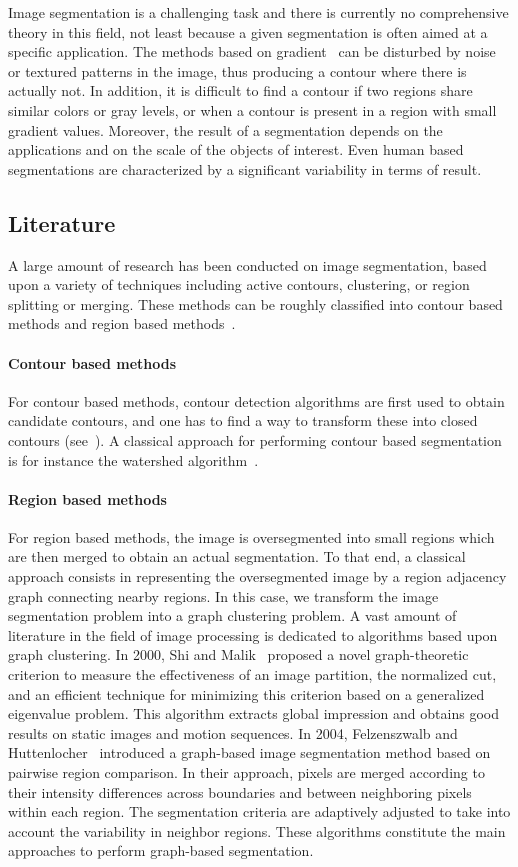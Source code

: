 \documentclass{article}
\begin{document}
        Image segmentation is a challenging task and there is currently no comprehensive theory in this field, not least because a given segmentation is often aimed at a specific application. The methods based on gradient~\cite{watershed1991,arbelaez2011} can be disturbed by noise or textured patterns in the image, thus producing a contour where there is actually not. In addition, it is difficult to find a contour if two regions share similar colors or gray levels, or when a contour is present in a region with small gradient values. Moreover, the result of a segmentation depends on the applications and on the scale of the objects of interest. Even human based segmentations are characterized by a significant variability in terms of result.

    \subsection{Literature}
        A large amount of research has been conducted on image segmentation, based upon a variety of techniques including active contours, clustering, or region splitting or merging. These methods can be roughly classified into contour based methods and region based methods~\cite{arbelaez2011}.
        \paragraph{Contour based methods} For contour based methods, contour detection algorithms are first used to obtain candidate contours, and one has to find a way to transform these into closed contours (see~\cite{ren2005, arbelaez2011}). A classical approach for performing contour based segmentation is for instance the watershed algorithm~\cite{watershed1991}.
        \paragraph{Region based methods} For region based methods, the image is oversegmented into small regions which are then merged to obtain an actual segmentation. To that end, a classical approach consists in representing the oversegmented image by a region adjacency graph connecting nearby regions. In this case, we transform the image segmentation problem into a graph clustering problem. A vast amount of literature in the field of image processing is dedicated to algorithms based upon graph clustering. In 2000, Shi and Malik~\cite{shi2000} proposed a novel graph-theoretic criterion to measure the effectiveness of an image partition, the normalized cut, and an efficient technique for minimizing this criterion based on a generalized eigenvalue problem. This algorithm extracts global impression and obtains good results on static images and motion sequences. In 2004, Felzenszwalb and Huttenlocher~\cite{felzenszwalb2004} introduced a graph-based image segmentation method based on pairwise region comparison. In their approach, pixels are merged according to their intensity differences across boundaries and between neighboring pixels within each region. The segmentation criteria are adaptively adjusted to take into account the variability in neighbor regions. These algorithms constitute the main approaches to perform graph-based segmentation.
        \bigskip
\end{document}
